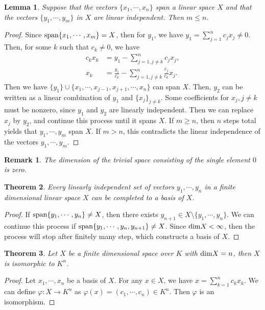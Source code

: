 \documentclass[11pt]{book}
\newtheorem{theorem}{Theorem}[chapter]
\newtheorem{lemma}[theorem]{Lemma}
\newtheorem{remark}{Remark}[chapter]
\theoremstyle{definition}
\numberwithin{equation}{chapter}
\begin{document}
\medskip

\begin{lemma}
Suppose that the vectors $\{x_1,\cdots,x_n\}$ span a linear space $X$ and that
the vectors $\{y_1,\cdots,y_m\}$ in $X$ are linear independent. Then $m \leq n$.
\end{lemma}
\begin{proof}
Since ${\rm span}\{x_1,\cdots,x_m\} = X$, then for $y_1$, we have $y_1 = \sum^n_{j=1}c_j x_j \neq 0$. Then, for some $k$ such that $c_k\neq 0$, we have
\begin{align*}
    c_k x_k & = y_1 - \sum^n_{j=1, j\neq k} c_j x_j, \\
    x_k & = \frac{y_1}{c_k} - \sum^n_{j=1, j\neq k} \frac{c_j}{c_k} x_j.
\end{align*}
Then we have $\{y_1\}\cup\{x_1,\cdots,x_{j-1},x_{j+1},\cdots, x_n\}$ can span $X$. Then, $y_2$ can be written as a linear combination of $y_1$ and $\{x_j\}_{j\neq k}$. Some coefficients for $x_j, j\neq k$ must be nonzero, since $y_1$ and $y_2$ are linearly independent. Then we can replace $x_j$ by $y_2$, and continue this process until it spans $X$. If $m \geq n$, then $n$ steps total yields that $y_1,\cdots,y_m$ span $X$. If $m > n$, this contradicts the linear independence of the vectors $y_1,\cdots,y_m$.
\end{proof}

\begin{remark}
The dimension of the trivial space consisting of the single element $0$ is zero.
\end{remark}

\medskip

\begin{theorem}
Every linearly independent set of vectors $y_1,\cdots,y_n$ in a finite dimensional linear space $X$ can be completed to a basis of $X$.
\end{theorem}
\begin{proof}
If ${\rm span}\{y_1,\cdots,y_n\} \neq X$, then there exists $y_{n+1}\in X \setminus \{y_1,\cdots,y_n\}$. We can continue this process if ${\rm span}\{y_1,\cdots,y_n, y_{n+1}\}\neq X$. Since ${\rm dim}X < \infty$, then the process will stop after finitely many step, which  constructs a basis of $X$.
\end{proof}

\medskip

\begin{theorem}
Let $X$ be a finite dimensional space over $K$ with ${\rm dim}X = n$, then $X$ is isomorphic to $K^n$.
\end{theorem}
\begin{proof}
Let $x_1, \cdots, x_n$ be a basis of $X$. For any $x\in X$, we have $x = \sum^n_{k=1}c_k x_k$. We can define $\varphi: X\to K^n$ as $\varphi(x) = (c_1, \cdots, c_n) \in K^n$. Then $\varphi$ is an isomorphism.
\end{proof}
\end{document}

